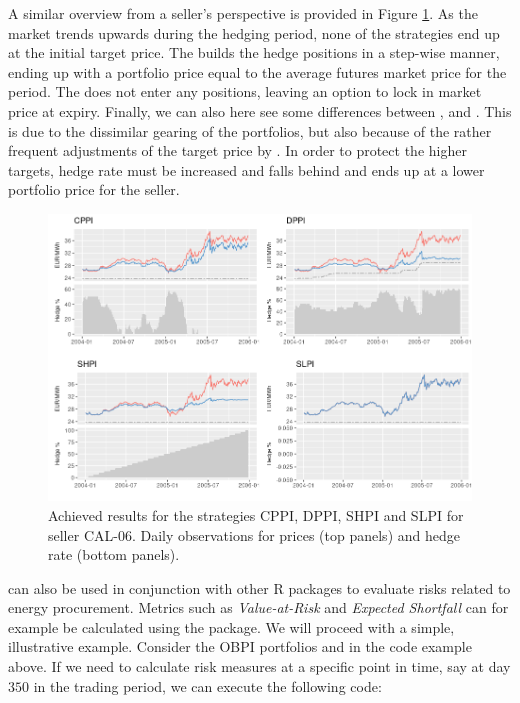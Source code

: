 A similar overview from a seller's perspective is provided in Figure \ref{fig:seller_strat}. As the market trends upwards during the hedging period, none of the strategies end up at the initial target price. The  builds the hedge positions in a step-wise manner, ending up with a portfolio price equal to the average futures market price for the period. The  does not enter any positions, leaving an option to lock in market price at expiry. Finally, we can also here see some differences between , and . This is due to the dissimilar gearing of the portfolios, but also because of the rather frequent adjustments of the target price by . In order to protect the higher targets, hedge rate must be increased and  falls behind  and ends up at a lower portfolio price for the seller.


\begin{figure}[!htb]
\includegraphics [scale = 0.58] {seller_strat.png}
\caption{Achieved results for the strategies CPPI, DPPI, SHPI and SLPI for seller CAL-06. Daily observations for prices (top panels) and hedge rate (bottom panels).}
\label{fig:seller_strat}
\end{figure}

\newpage

 can also be used in conjunction with other R packages to evaluate risks related to energy procurement. Metrics such as \textit{Value-at-Risk} and \textit{Expected Shortfall} can for example be calculated using the  package. We will proceed with a simple, illustrative example. Consider the OBPI portfolios  and  in the code example above. If we need to calculate risk measures at a specific point in time, say at day $350$ in the trading period, we can execute the following code:


